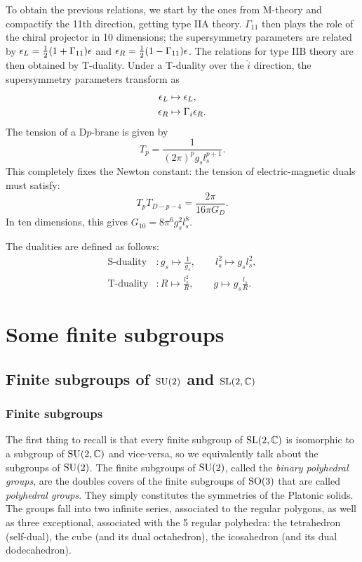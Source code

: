     To obtain the previous relations, we start by the ones from M-theory and compactify the 11th direction, getting type IIA theory. $\Gamma_{11}$ then plays the role of the chiral projector in 10 dimensions; the supersymmetry parameters are related by $\epsilon_L=\frac{1}{2}(1+\Gamma_{11})\epsilon$ and $\epsilon_R=\frac{1}{2}(1-\Gamma_{11})\epsilon$. The relations for type IIB theory are then obtained by T-duality. Under a T-duality over the $\hat{i}$ direction, the supersymmetry parameters transform as
    \begin{align*}
        \epsilon_L &\mapsto \epsilon_L,\\
        \epsilon_R &\mapsto \Gamma_i\epsilon_R.
    \end{align*}
    The tension of a D$p$-brane is given by
    \begin{equation}
        T_{p} = \frac{1}{(2\pi)^pg_sl^{p+1}_s}.
    \end{equation}
    This completely fixes the Newton constant: the tension of electric-magnetic duals must satisfy:
    \begin{equation}
        T_pT_{D-p-4} = \frac{2\pi}{16\pi G_D}.
    \end{equation}
    In ten dimensions, this gives $G_{10}=8\pi^6g^2_sl^8_s$.

    The dualities are defined as follows:
    \begin{align*}
        \text{S-duality} &: g_s\mapsto\frac{1}{g_s},\qquad l^2_s\mapsto g_sl^2_s,\\
        \text{T-duality} &: R\mapsto\frac{l^2_s}{R},\qquad g\mapsto g_s\frac{l_s}{R}.
    \end{align*}

\section{Some finite subgroups}

    \subsection{Finite subgroups of $\text{SU}(2)$ and $\text{SL}(2,\mathbb{C})$}

        \subsubsection{Finite subgroups}

            The first thing to recall is that every finite subgroup of $\text{SL}(2,\mathbb{C})$ is isomorphic to a subgroup of $\text{SU}(2,\mathbb{C})$ and vice-versa, so we equivalently talk about the subgroups of $\text{SU}(2)$. The finite subgroups of $\text{SU}(2)$, called the \emph{binary polyhedral groups}, are the doubles covers of the finite subgroups of $\text{SO}(3)$ that are called \emph{polyhedral groups}. They simply constitutes the symmetries of the Platonic solids. The groups fall into two infinite series, associated to the regular polygons, as well as three exceptional, associated with the 5 regular polyhedra: the tetrahedron (self-dual), the cube (and its dual octahedron), the icosahedron (and its dual dodecahedron).

